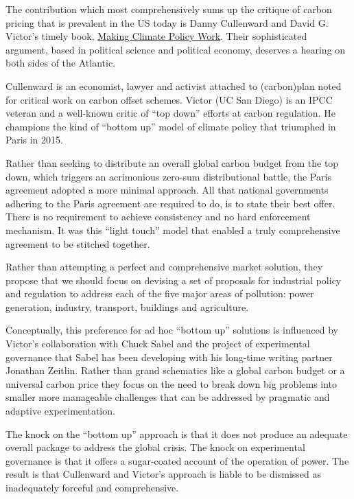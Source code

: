 \documentclass[
]{book}
\begin{document}
The contribution which most comprehensively sums up the critique of carbon pricing that is prevalent in the US today is Danny Cullenward and David G. Victor's timely book,
\href{https://www.amazon.com/s?k=cullenward+victor\&ref=nb_sb_noss}{Making Climate Policy Work}. Their sophisticated argument, based in political science and political economy, deserves a hearing on both sides of the Atlantic.

Cullenward is an economist, lawyer and activist attached to (carbon)plan noted for critical work on carbon offset schemes. Victor (UC San Diego) is an IPCC veteran and a well-known critic of ``top down'' efforts at carbon regulation. He champions the kind of ``bottom up'' model of climate policy that triumphed in Paris in 2015.

Rather than seeking to distribute an overall global carbon budget from the top down, which triggers an acrimonious zero-sum distributional battle, the Paris agreement adopted a more minimal approach. All that national governments adhering to the Paris agreement are required to do, is to state their best offer. There is no requirement to achieve consistency and no hard enforcement mechanism. It was this ``light touch'' model that enabled a truly comprehensive agreement to be stitched together.

Rather than attempting a perfect and comprehensive market solution, they propose that we should focus on devising a set of proposals for industrial policy and regulation to address each of the five major areas of pollution: power generation, industry, transport, buildings and agriculture.

Conceptually, this preference for ad hoc ``bottom up'' solutions is influenced by Victor's collaboration with Chuck Sabel and the project of experimental governance that Sabel has been developing with his long-time writing partner Jonathan Zeitlin. Rather than grand schematics like a global carbon budget or a universal carbon price they focus on the need to break down big problems into smaller more manageable challenges that can be addressed by pragmatic and adaptive experimentation.

The knock on the ``bottom up'' approach is that it does not produce an adequate overall package to address the global crisis. The knock on experimental governance is that it offers a sugar-coated account of the operation of power. The result is that Cullenward and Victor's approach is liable to be dismissed as inadequately forceful and comprehensive.
\end{document}
